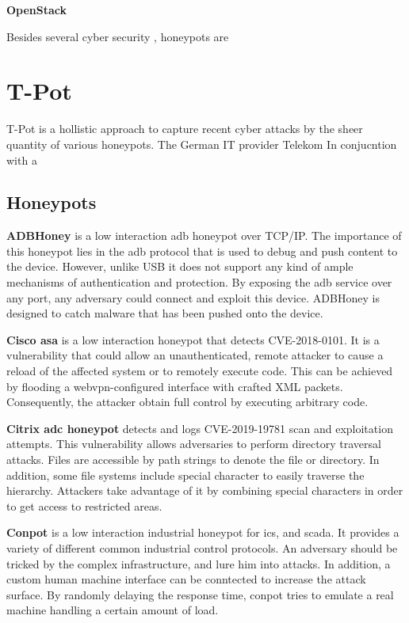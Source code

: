 \textbf{OpenStack}

Besides several cyber security , honeypots are 

\section{T-Pot}

T-Pot is a hollistic approach to capture recent cyber attacks by the sheer quantity of various honeypots.
The German IT provider Telekom  
In conjucntion with a 

\subsection{Honeypots}

\textbf{ADBHoney} \cite{adbhoney2021} is a low interaction \ac{adb} honeypot over TCP/IP.
The importance of this honeypot lies in the \ac{adb} protocol that is used to debug and push content to the device.
However, unlike USB it does not support any kind of ample mechanisms of authentication and protection.
By exposing the \ac{adb} service over any port, any adversary could connect and exploit this device.
ADBHoney is designed to catch malware that has been pushed onto the device.

\textbf{Cisco \ac{asa}} \cite{cymmetria2018} is a low interaction honeypot that detects CVE-2018-0101\cite{CVE-2018-0101}.
It is a vulnerability that could allow an unauthenticated, remote attacker to cause a reload of the affected system or to remotely execute code.
This can be achieved by flooding a webvpn-configured interface with crafted XML packets.
Consequently, the attacker obtain full control by executing arbitrary code.

\textbf{Citrix \ac{adc} honeypot} \cite{citrixhoneypot2020} detects and logs CVE-2019-19781\cite{CVE-2019-19781} scan and exploitation attempts.
This vulnerability allows adversaries to perform directory traversal attacks. 
Files are accessible by path strings to denote the file or directory.
In addition, some file systems include special character to easily traverse the hierarchy.
Attackers take advantage of it by combining special characters in order to get access to restricted areas. \cite{flanders2019}

\textbf{Conpot} \cite{conpot2021} is a low interaction industrial honeypot for \ac{ics}, and \ac{scada}.
It provides a variety of different common industrial control protocols.
An adversary should be tricked by the complex infrastructure, and lure him into attacks.
In addition, a custom human machine interface can be conntected to increase the attack surface.
By randomly delaying the response time, conpot tries to emulate a real machine handling a certain amount of load.

